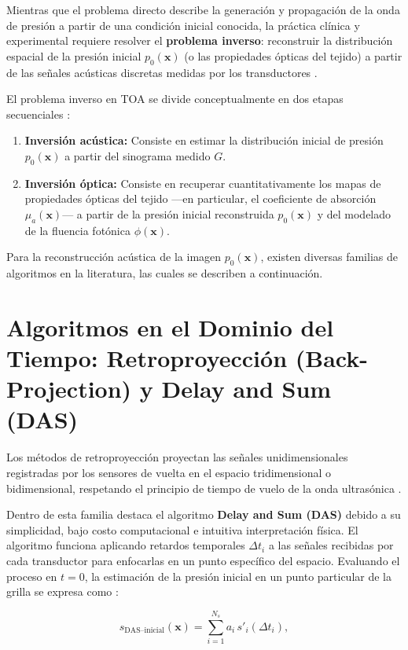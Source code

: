 Mientras que el problema directo describe la generación y propagación de la onda de presión a partir de una condición inicial conocida, la práctica clínica y experimental requiere resolver el \textbf{problema inverso}: reconstruir la distribución espacial de la presión inicial $p_0(\mathbf{x})$ (o las propiedades ópticas del tejido) a partir de las señales acústicas discretas medidas por los transductores \cite{DiLiscia2026}.

El problema inverso en TOA se divide conceptualmente en dos etapas secuenciales \cite{DiLiscia2026}:
\begin{enumerate}
    \item \textbf{Inversión acústica:} Consiste en estimar la distribución inicial de presión $p_0(\mathbf{x})$ a partir del sinograma medido $G$.
    \item \textbf{Inversión óptica:} Consiste en recuperar cuantitativamente los mapas de propiedades ópticas del tejido —en particular, el coeficiente de absorción $\mu_a(\mathbf{x})$— a partir de la presión inicial reconstruida $p_0(\mathbf{x})$ y del modelado de la fluencia fotónica $\phi(\mathbf{x})$.
\end{enumerate}

Para la reconstrucción acústica de la imagen $p_0(\mathbf{x})$, existen diversas familias de algoritmos en la literatura, las cuales se describen a continuación.

\section{Algoritmos en el Dominio del Tiempo: Retroproyección (Back-Projection) y Delay and Sum (DAS)}
Los métodos de retroproyección proyectan las señales unidimensionales registradas por los sensores de vuelta en el espacio tridimensional o bidimensional, respetando el principio de tiempo de vuelo de la onda ultrasónica \cite{DiLiscia2026}.

Dentro de esta familia destaca el algoritmo \textbf{Delay and Sum (DAS)} debido a su simplicidad, bajo costo computacional e intuitiva interpretación física. El algoritmo funciona aplicando retardos temporales $\Delta t_i$ a las señales recibidas por cada transductor para enfocarlas en un punto específico del espacio. Evaluando el proceso en $t = 0$, la estimación de la presión inicial en un punto particular de la grilla se expresa como \cite{DiLiscia2026}:

\begin{equation}
    s_{\text{DAS--inicial}}(\mathbf{x}) = \sum_{i=1}^{N_s} a_i \, s'_i(\Delta t_i),
    \label{eq:das_inicial}
\end{equation}

